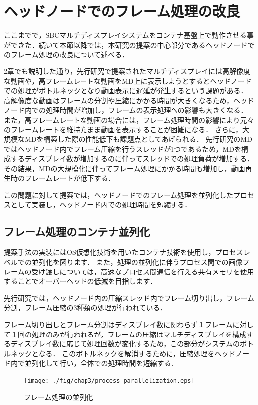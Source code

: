 \section{ヘッドノードでのフレーム処理の改良}
ここまでで，SBCマルチディスプレイシステムをコンテナ基盤上で動作させる事ができた．続いて本節以降では，本研究の提案の中心部分であるヘッドノードでのフレーム処理の改良について述べる．

2章でも説明した通り，先行研究で提案されたマルチディスプレイには高解像度な動画や，高フレームレートな動画をMD上に表示しようとするとヘッドノードでの処理がボトルネックとなり動画表示に遅延が発生するという課題がある．
高解像度な動画はフレームの分割や圧縮にかかる時間が大きくなるため，ヘッドノード内での処理時間が増加し，フレームの表示処理への影響も大きくなる．
また，高フレームレートな動画の場合には，フレーム処理時間の影響により元々のフレームレートを維持たまま動画を表示することが困難になる．
さらに，大規模なMDを構築した際の性能低下も課題点としてあげられる．
先行研究のMDではヘッドノード内でフレーム圧縮を行うスレッドが1つであるため，MDを構成するディスプレイ数が増加するのに伴ってスレッドでの処理負荷が増加する．
その結果，MDの大規模化に伴ってフレーム処理にかかる時間も増加し，動画再生時のフレームレートが低下する．

この問題に対して提案では，ヘッドノードでのフレーム処理を並列化したプロセスとして実装し，ヘッドノード内での処理時間を短縮する．

\subsection*{フレーム処理のコンテナ並列化}
提案手法の実装にはOS仮想化技術を用いたコンテナ技術を使用し，プロセスレベルでの並列化を図ります．
また，処理の並列化に伴うプロセス間での画像フレームの受け渡しについては，高速なプロセス間通信を行える共有メモリを使用することでオーバーヘッドの低減を目指します．

先行研究では，ヘッドノード内の圧縮スレッド内でフレーム切り出し，フレーム分割，フレーム圧縮の3種類の処理が行われている．

フレーム切り出しとフレーム分割はディスプレイ数に関わらず１フレームに対して１回の処理のみが行われるが，フレームの圧縮はマルチディスプレイを構成するディスプレイ数に応じて処理回数が変化するため，この部分がシステムのボトルネックとなる．
このボトルネックを解消するために，圧縮処理をヘッドノード内で並列化して行い，全体での処理時間を短縮する．

\begin{figure}[H]
    \hspace*{\fill}
    \texttt{[image: ./fig/chap3/process\_parallelization.eps]}
    \hspace*{\fill}
    \caption{フレーム処理の並列化}
\end{figure}


